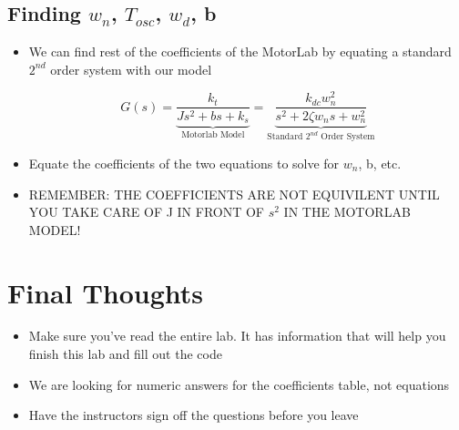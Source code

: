 \documentclass[11pt, oneside]{article}   	%
\begin{document}
\subsection{Finding \(w_n\), \(T_{osc}\), \(w_d\), b}
\begin{itemize}
\item We can find rest of the coefficients of the MotorLab by equating a standard \(2^{nd}\) order system with our model

\[ G(s) = 
\underbrace{\frac{k_t}{Js^2 + bs + k_s}}_\text{Motorlab Model} = 
\underbrace{\frac{k_{dc}w_n^2 }{s^2 + 2\zeta w_n s + w_n^2}}_\text{Standard \(2^{nd}\) Order System}  \]

\item Equate the coefficients of the two equations to solve for \(w_n\), b, etc.
\item REMEMBER: THE COEFFICIENTS ARE NOT EQUIVILENT UNTIL YOU TAKE CARE OF J IN FRONT OF \(s^2\) IN THE MOTORLAB MODEL! 

\end{itemize}

\section{Final Thoughts}
\begin{itemize}
\item Make sure you've read the entire lab. It has information that will help you finish this lab and fill out the code
\item We are looking for numeric answers for the coefficients table, not equations
\item Have the instructors sign off the questions before you leave
\end{itemize}
\end{document}
